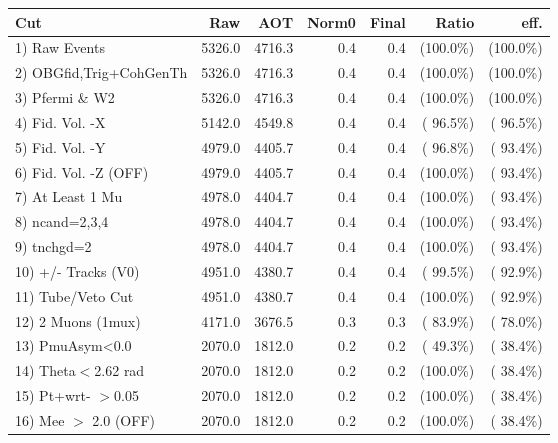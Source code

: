  \begin{table}[h!]\centering
 \begin{tabular}{||l||r|r|r|r|r|r||}
 \hline
 \hline
 Cut & Raw & AOT & Norm0 & Final & Ratio & eff.       \\
 \hline
  1) Raw Events           &       5326.0 &       4716.3 &          0.4 &          0.4 & (100.0\%) & (100.0\%) \\
  2) OBGfid,Trig+CohGenTh &       5326.0 &       4716.3 &          0.4 &          0.4 & (100.0\%) & (100.0\%) \\
  3) Pfermi \& W2         &       5326.0 &       4716.3 &          0.4 &          0.4 & (100.0\%) & (100.0\%) \\
  4) Fid. Vol. -X         &       5142.0 &       4549.8 &          0.4 &          0.4 & ( 96.5\%) & ( 96.5\%) \\
  5) Fid. Vol. -Y         &       4979.0 &       4405.7 &          0.4 &          0.4 & ( 96.8\%) & ( 93.4\%) \\
  6) Fid. Vol. -Z (OFF)   &       4979.0 &       4405.7 &          0.4 &          0.4 & (100.0\%) & ( 93.4\%) \\
  7) At Least 1 Mu        &       4978.0 &       4404.7 &          0.4 &          0.4 & (100.0\%) & ( 93.4\%) \\
  8) ncand=2,3,4          &       4978.0 &       4404.7 &          0.4 &          0.4 & (100.0\%) & ( 93.4\%) \\
  9) tnchgd=2             &       4978.0 &       4404.7 &          0.4 &          0.4 & (100.0\%) & ( 93.4\%) \\
 10) +/- Tracks (V0)      &       4951.0 &       4380.7 &          0.4 &          0.4 & ( 99.5\%) & ( 92.9\%) \\
 11) Tube/Veto Cut        &       4951.0 &       4380.7 &          0.4 &          0.4 & (100.0\%) & ( 92.9\%) \\
 12) 2 Muons (1mux)       &       4171.0 &       3676.5 &          0.3 &          0.3 & ( 83.9\%) & ( 78.0\%) \\
 13) PmuAsym<0.0          &       2070.0 &       1812.0 &          0.2 &          0.2 & ( 49.3\%) & ( 38.4\%) \\
 14) Theta$<$2.62 rad     &       2070.0 &       1812.0 &          0.2 &          0.2 & (100.0\%) & ( 38.4\%) \\
 15) Pt+wrt- $>$0.05      &       2070.0 &       1812.0 &          0.2 &          0.2 & (100.0\%) & ( 38.4\%) \\
 16) Mee $>$ 2.0  (OFF)   &       2070.0 &       1812.0 &          0.2 &          0.2 & (100.0\%) & ( 38.4\%) \\

\end{tabular}
\end{table}
